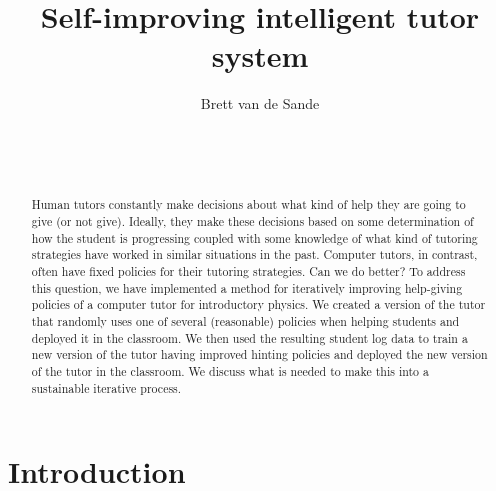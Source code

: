 \documentclass{edm_template}
\begin{document}
\title{Self-improving intelligent tutor system}
\author{
\alignauthor
      Brett van de Sande\\
       \\
       \\
       \\
}
\maketitle

%



\begin{abstract}
Human tutors constantly make decisions about
what kind of help they are going to give (or not give).  Ideally,
they make these decisions based on some determination of how
the student is progressing coupled with some knowledge of what kind
of tutoring strategies have worked in similar situations in the past.
Computer tutors, in contrast, often have fixed policies for their
tutoring strategies.   Can we do better?  To address this question, 
we have implemented a method for iteratively improving 
help-giving policies of a computer tutor for introductory physics.  
We created a version of the tutor that randomly uses one of several 
(reasonable) policies when helping students and deployed it in the
classroom.  We then used the resulting student log data to 
train a new version of the tutor having improved hinting policies
and deployed the new version of the tutor in the classroom.  
We discuss what is needed to make this into a sustainable iterative process.
\end{abstract}


\section{Introduction}
\end{document}
